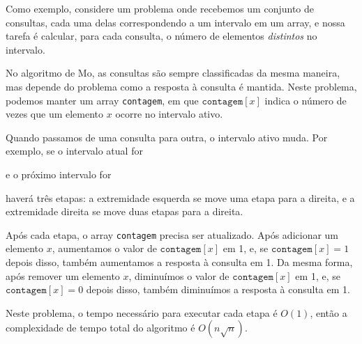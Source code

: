 Como exemplo, considere um problema
onde recebemos um conjunto de consultas,
cada uma delas correspondendo a um intervalo em um array,
e nossa tarefa é calcular, para cada consulta,
o número de elementos \emph{distintos} no intervalo.

No algoritmo de Mo, as consultas são sempre classificadas
da mesma maneira, mas depende do problema
como a resposta à consulta é mantida.
Neste problema, podemos manter um array
\texttt{contagem}, em que $\texttt{contagem}[x]$
indica o número de vezes que um elemento $x$
ocorre no intervalo ativo.

Quando passamos de uma consulta para outra,
o intervalo ativo muda.
Por exemplo, se o intervalo atual for
\begin{center}
\end{center}
e o próximo intervalo for
\begin{center}
\end{center}
haverá três etapas:
a extremidade esquerda se move uma etapa para a direita,
e a extremidade direita se move duas etapas para a direita.

Após cada etapa, o array \texttt{contagem}
precisa ser atualizado.
Após adicionar um elemento $x$,
aumentamos o valor de
$\texttt{contagem}[x]$ em 1,
e, se $\texttt{contagem}[x]=1$ depois disso,
também aumentamos a resposta à consulta em 1.
Da mesma forma, após remover um elemento $x$,
diminuímos o valor de
$\texttt{contagem}[x]$ em 1,
e, se $\texttt{contagem}[x]=0$ depois disso,
também diminuímos a resposta à consulta em 1.

Neste problema, o tempo necessário para executar
cada etapa é $O(1)$, então a complexidade de tempo total
do algoritmo é $O(n \sqrt n)$.